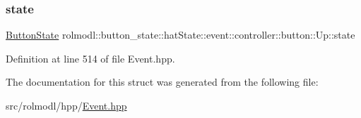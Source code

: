 \subsubsection{\texorpdfstring{state}{state}}
{\footnotesize\ttfamily \mbox{\hyperlink{namespacerolmodl_ad08ec5c56aa1db118f871357b2d475fd}{Button\+State}} rolmodl\+::button\+\_\+state\+::hat\+State\+::event\+::controller\+::button\+::\+Up\+::state}



Definition at line 514 of file Event.\+hpp.



The documentation for this struct was generated from the following file\+:\begin{DoxyCompactItemize}
\item 
src/rolmodl/hpp/\mbox{\hyperlink{_event_8hpp}{Event.\+hpp}}\end{DoxyCompactItemize}
